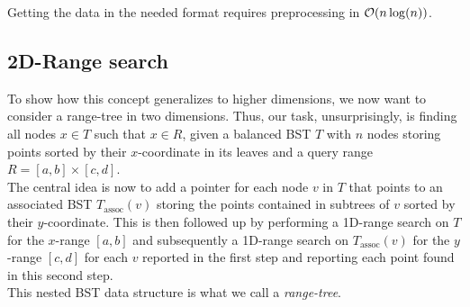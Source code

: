         \begin{remark}
            Getting the data in the needed format requires preprocessing in $\mathcal{O}(n\log(n))$. 
        \end{remark}

    \subsection{2D-Range search}
        To show how this concept generalizes to higher dimensions, we now want to consider a range-tree in two dimensions. Thus, our task, unsurprisingly, is finding all nodes $x \in T$ such that $x \in R$, given a balanced BST $T$ with $n$ nodes storing points sorted by their $x$-coordinate in its leaves and a query range $R = [a, b] \times [c, d]$. \\
        The central idea is now to add a pointer for each node $v$ in $T$ that points to an associated BST $T_\text{assoc}(v)$ storing the points contained in subtrees of $v$ sorted by their $y$-coordinate. This is then followed up by performing a 1D-range search on $T$ for the $x$-range $[a, b]$ and subsequently a 1D-range search on $T_\text{assoc}(v)$ for the $y$-range $[c, d]$ for each $v$ reported in the first step and reporting each point found in this second step. \\
        This nested BST data structure is what we call a \emph{range-tree}. 

